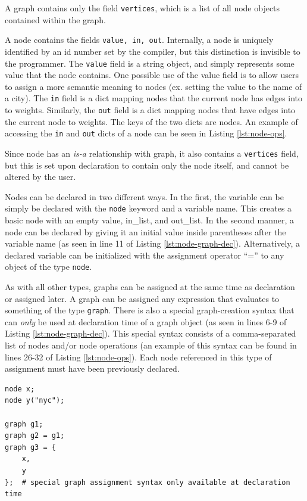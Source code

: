 \documentclass{article}
\newcommand{\code}[1]{\texttt{#1}} %
\begin{document}
A graph contains only the field \code{vertices}, which is a list of all node objects contained within the graph. 

A node contains the fields \code{value, in, out}. Internally, a node is uniquely identified by an id number set by the compiler, but this distinction is invisible to the programmer. The \code{value} field is a string object, and simply represents some value that the node contains. One possible use of the value field is to allow users to assign a more semantic meaning to nodes (ex. setting the value to the name of a city). The \code{in} field is a dict mapping nodes that the current node has edges into to weights. Similarly, the \code{out} field is a dict mapping nodes that have edges into the current node to weights. The keys of the two dicts are nodes. An example of accessing the \code{in} and \code{out} dicts of a node can be seen in Listing \ref{lst:node-ops}.

Since node has an \emph{is-a} relationship with graph, it also contains a \code{vertices} field, but this is set upon declaration to contain only the node itself, and cannot be altered by the user.

Nodes can be declared in two different ways. In the first, the variable can be simply be declared with the \code{node} keyword and a variable name. This creates a basic node with an empty value, in\_list, and out\_list. In the second manner, a node can be declared by giving it an initial value inside parentheses after the variable name (as seen in line 11 of Listing \ref{lst:node-graph-dec}). Alternatively, a declared variable can be initialized with the assignment operator ``='' to any object of the type \code{node}.

As with all other types, graphs can be assigned at the same time as declaration or assigned later. A graph can be assigned any expression that evaluates to something of the type \code{graph}. There is also a special graph-creation syntax that can \emph{only} be used at declaration time of a graph object  (as seen in lines 6-9 of Listing \ref{lst:node-graph-dec}). This special syntax consists of a comma-separated list of nodes and/or node operations (an example of this syntax can be found in lines 26-32 of Listing \ref{lst:node-ops}). Each node referenced in this type of assignment must have been previously declared. \\

\begin{lstlisting}[language=pltLang, caption=Declaration of ``node'' and ``graph'' objects., label=lst:node-graph-dec]
node x;
node y("nyc");

graph g1;
graph g2 = g1;
graph g3 = { 
    x,
    y
};  # special graph assignment syntax only available at declaration time

\end{lstlisting}
\end{document}
